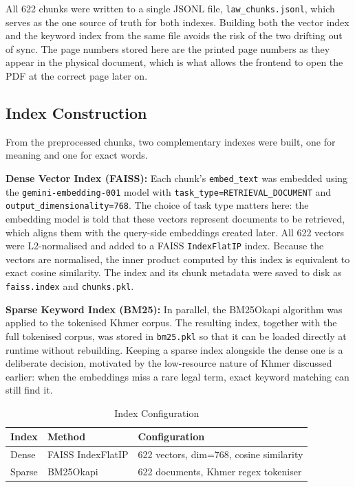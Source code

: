\hs All 622 chunks were written to a single JSONL file, \texttt{law\_chunks.jsonl},
which serves as the one source of truth for both indexes. Building both the vector index
and the keyword index from the same file avoids the risk of the two drifting out of
sync. The page numbers stored here are the printed page numbers as they appear in the
physical document, which is what allows the frontend to open the PDF at the correct page
later on.

\subsection{Index Construction}

\hs From the preprocessed chunks, two complementary indexes were built, one for meaning
and one for exact words.

\textbf{Dense Vector Index (FAISS):} Each chunk's \texttt{embed\_text} was embedded
using the \texttt{gemini-embedding-001} model with
\texttt{task\_type=RETRIEVAL\_DOCUMENT} and \texttt{output\_dimensionality=768}. The
choice of task type matters here: the embedding model is told that these vectors
represent documents to be retrieved, which aligns them with the query-side embeddings
created later. All 622 vectors were L2-normalised and added to a FAISS
\texttt{IndexFlatIP} index. Because the vectors are normalised, the inner product
computed by this index is equivalent to exact cosine similarity. The index and its chunk
metadata were saved to disk as \texttt{faiss.index} and \texttt{chunks.pkl}.

\textbf{Sparse Keyword Index (BM25):} In parallel, the BM25Okapi algorithm was applied
to the tokenised Khmer corpus. The resulting index, together with the full tokenised
corpus, was stored in \texttt{bm25.pkl} so that it can be loaded directly at runtime
without rebuilding. Keeping a sparse index alongside the dense one is a deliberate
decision, motivated by the low-resource nature of Khmer discussed earlier: when the
embeddings miss a rare legal term, exact keyword matching can still find it.

\begin{table}[H]
\centering
\caption{Index Configuration}
\label{tab:index_config}
\begin{tabular}{lll}
\toprule
\textbf{Index} & \textbf{Method} & \textbf{Configuration} \\
\midrule
Dense & FAISS IndexFlatIP & 622 vectors, dim=768, cosine similarity \\
Sparse & BM25Okapi & 622 documents, Khmer regex tokeniser \\
\bottomrule
\end{tabular}
\end{table}

